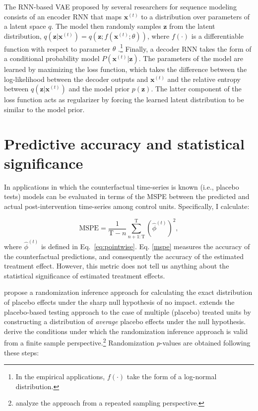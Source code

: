 \documentclass[hidelinks,12pt]{article}
\begin{document}
The RNN-based VAE proposed by several researchers \citep{fabius2014variational, chung2015recurrent,bowman2015generating} for sequence modeling consists of an encoder RNN that maps $\boldsymbol{x}^{(t)}$ to a distribution over parameters of a latent space $q$. The model then randomly samples $\boldsymbol{z}$ from the latent distribution, $q(\boldsymbol{z} | \boldsymbol{x}^{(t)}) = q (\boldsymbol{z}; f(\boldsymbol{x}^{(t)}; \theta))$, where $f(\cdot)$ is a differentiable function with respect to parameter $\theta$ \citep[pp. 699][]{goodfellow2016deep}.\footnote{In the empirical applications, $f(\cdot)$ take the form of a log-normal distribution.} Finally, a decoder RNN takes the form of a conditional probability model $P (\boldsymbol{x}^{(t)} | \boldsymbol{z})$. The parameters of the model are learned by maximizing the loss function, which takes the difference between the log-likelihood between the decoder outputs and $\boldsymbol{x}^{(t)}$ and the relative entropy between  $q(\boldsymbol{z} | \boldsymbol{x}^{(t)})$ and the model prior $p (\boldsymbol{z})$. The latter component of the loss function acts as regularizer by forcing the learned latent distribution to be similar to the model prior. 

\section{Predictive accuracy and statistical significance} \label{eval}

In applications in which the counterfactual time-series is known (i.e., placebo tests) models can be evaluated in terms of the MSPE between the predicted and actual post-intervention time-series among control units. Specifically, I calculate:

\begin{equation}
	\text{MSPE} = \frac{1}{\text{T}-n} \sum_{n+1: \text{T}}^{\text{T}} \left(\hat{\phi}^{(t)} \right)^2, \label{mspe}
\end{equation} where $\hat{\phi}^{(t)}$ is defined in Eq.~\ref{eq:pointwise}. Eq. \ref{mspe} measures the accuracy of the counterfactual predictions, and consequently the accuracy of the estimated treatment effect. However, this metric does not tell us anything about the statistical significance of estimated treatment effects. 

\citet{abadie2010synthetic} propose a randomization inference approach for calculating the exact distribution of placebo effects under the sharp null hypothesis of no impact. \citet{cavallo2013catastrophic} extends the placebo-based testing approach to the case of multiple (placebo) treated units by constructing a distribution of \emph{average} placebo effects under the null hypothesis. \citet{firpo2018synthetic} derive the conditions under which the randomization inference approach is valid from a finite sample perspective.\footnote{\citet{hahn2017synthetic} analyze the approach from a repeated sampling perspective.} Randomization $p$-values are obtained following these steps:
\end{document}
